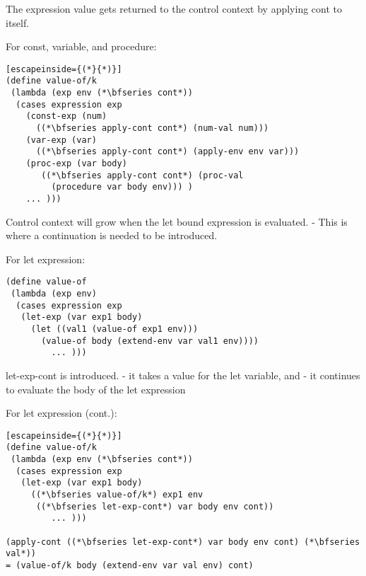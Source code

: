 \documentclass{article}
\begin{document}
\begin{huge}
The expression value gets returned to the control context by applying cont to itself. 


For const, variable, and procedure:
\begin{lstlisting}[escapeinside={(*}{*)}]
(define value-of/k
 (lambda (exp env (*\bfseries cont*)) 
  (cases expression exp 
    (const-exp (num) 
      ((*\bfseries apply-cont cont*) (num-val num)))
    (var-exp (var) 
      ((*\bfseries apply-cont cont*) (apply-env env var)))
    (proc-exp (var body) 
       ((*\bfseries apply-cont cont*) (proc-val 
         (procedure var body env))) )
    ... )))
\end{lstlisting}


Control context will grow when the let bound expression is evaluated. \al
- This is where a continuation is needed to be introduced.

For let expression:
\begin{lstlisting}
(define value-of
 (lambda (exp env) 
  (cases expression exp 
   (let-exp (var exp1 body) 
     (let ((val1 (value-of exp1 env)))
       (value-of body (extend-env var val1 env))))
         ... )))
\end{lstlisting}


let-exp-cont is introduced. \al
- it takes a value for the let variable, and \al
- it continues to evaluate the body of the let expression

For let expression (cont.): 
\begin{lstlisting}[escapeinside={(*}{*)}]
(define value-of/k
 (lambda (exp env (*\bfseries cont*)) 
  (cases expression exp 
   (let-exp (var exp1 body) 
     ((*\bfseries value-of/k*) exp1 env
      ((*\bfseries let-exp-cont*) var body env cont))
         ... )))
         
(apply-cont ((*\bfseries let-exp-cont*) var body env cont) (*\bfseries val*))
= (value-of/k body (extend-env var val env) cont)
\end{lstlisting}



\end{huge}
\end{document}
